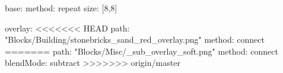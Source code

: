 base:
  method: repeat
  size: [8,8]

overlay:
<<<<<<< HEAD
  path: "Blocks/Building/stonebricks_sand_red_overlay.png"
  method: connect
=======
  path: "Blocks/Misc/_sub_overlay_soft.png"
  method: connect
  blendMode: subtract
>>>>>>> origin/master
